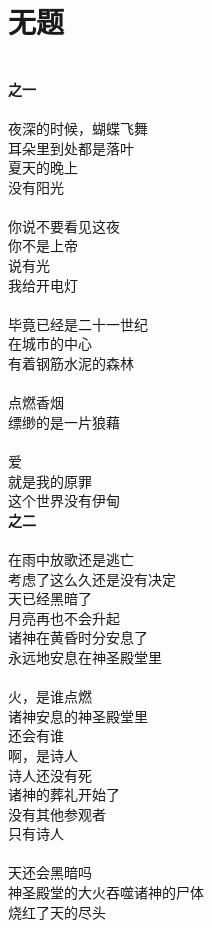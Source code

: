 \section{无题}
\leftskip=20mm
\noindent \\
\textbf{之一}\\
\\
夜深的时候，蝴蝶飞舞\\
耳朵里到处都是落叶\\
夏天的晚上\\
没有阳光\\
\\
你说不要看见这夜\\
你不是上帝\\
说有光\\
我给开电灯\\
\\
毕竟已经是二十一世纪\\
在城市的中心\\
有着钢筋水泥的森林\\
\\
点燃香烟\\
缥缈的是一片狼藉\\
\\
爱\\
就是我的原罪\\
这个世界没有伊甸\\
\newpage\noindent
\textbf{之二}\\
\\
在雨中放歌还是逃亡\\
考虑了这么久还是没有决定\\
天已经黑暗了\\
月亮再也不会升起\\
诸神在黄昏时分安息了\\
永远地安息在神圣殿堂里\\
\\
火，是谁点燃\\
诸神安息的神圣殿堂里\\
还会有谁\\
啊，是诗人\\
诗人还没有死\\
诸神的葬礼开始了\\
没有其他参观者\\
只有诗人\\
\\
天还会黑暗吗\\
神圣殿堂的大火吞噬诸神的尸体\\
烧红了天的尽头\\
